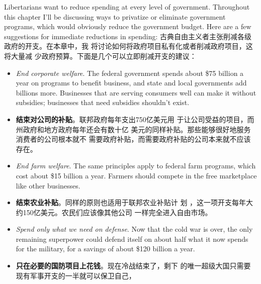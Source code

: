 \begin{paracol}{2}
Libertarians want to reduce spending at every level of government. Throughout this chapter I'll be discussing ways to privatize or eliminate government programs, which would obviously
reduce the government budget. Here are a few suggestions for
immediate reductions in spending:
\switchcolumn
古典自由主义者主张削减各级政府的开支。在本章中，我
将讨论如何将政府项目私有化或者削减政府项目，这将大量减
少政府预算。下面是几个可以立即削减开支的建议：
\switchcolumn*
\begin{itemize}
	\item \textit{End corporate welfare}. The federal government spends about
	\$75 billion a year on programs to benefit business, and state
	and local governments add billions more. Businesses that are
	serving consumers well can make it without subsidies; businesses that need subsidies shouldn't exist.
\end{itemize}
\switchcolumn
\begin{itemize}
	\item \textbf{结束对公司的补贴}。联邦政府每年支出750亿美元用
	于让公司受益的项目，而州政府和地方政府每年还会有数十亿
	美元的同样补贴。那些能够很好地服务消费者的公司根本就不
	需要政府补贴，而需要政府补贴的公司本来就不应该存在。
\end{itemize}
\switchcolumn*
\begin{itemize}
	\item \textit{End farm welfare}. The same principles apply to federal farm
	programs, which cost about \$15 billion a year. Farmers
	should compete in the free marketplace like other businesses.
\end{itemize}
\switchcolumn
\begin{itemize}
	\item \textbf{结束农业补贴}。同样的原则也适用于联邦农业补贴计
	划 ，这一项开支每年大约150亿美元。农民们应该像其他公司
	一样完全进入自由市场。
\end{itemize}
\switchcolumn*
\begin{itemize}
	\item \textit{Spend only what we need on defense}. Now that the cold war is
	over, the only remaining superpower could defend itself on
	about half what it now spends for the military, for a savings
	of about \$120 billion a year.
\end{itemize}
\switchcolumn
\begin{itemize}
	\item \textbf{只在必要的国防项目上花钱}。现在冷战结束了，剩下
	的唯一超级大国只需要现有军事开支的一半就可以保卫自己，

\end{itemize}
\end{paracol}
